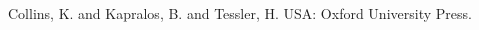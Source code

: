 

\begin{thebibliography}{99}

    Collins, K. and Kapralos, B. and Tessler, H.
    USA: Oxford University Press.

\end{thebibliography}

